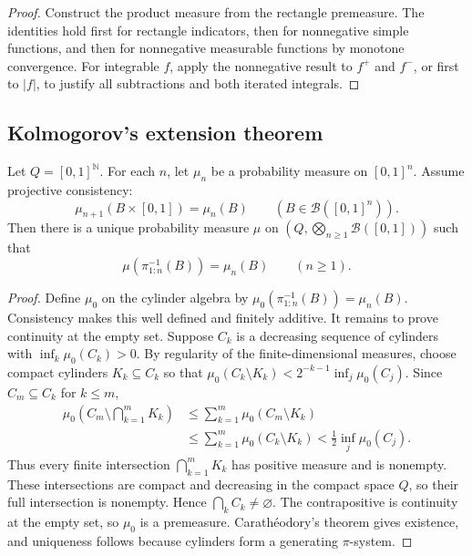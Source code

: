 \begin{proof}
Construct the product measure from the rectangle premeasure. The identities
hold first for rectangle indicators, then for nonnegative simple functions,
and then for nonnegative measurable functions by monotone convergence. For
integrable $f$, apply the nonnegative result to $f^+$ and $f^-$, or first to
$|f|$, to justify all subtractions and both iterated integrals.
\end{proof}

\subsection{Kolmogorov's extension theorem}

\begin{thm}
Let $Q=[0,1]^{\mathbb N}$. For each $n$, let $\mu_n$ be a probability measure
on $[0,1]^n$. Assume projective consistency:
\[
\mu_{n+1}(B\times[0,1])=\mu_n(B)
\qquad(B\in\mathcal B([0,1]^n)).
\]
Then there is a unique probability measure $\mu$ on
$(Q,\bigotimes_{n\ge1}\mathcal B([0,1]))$ such that
\[
\mu(\pi_{1:n}^{-1}(B))=\mu_n(B)
\qquad(n\ge1).
\]
\end{thm}

\begin{proof}
Define $\mu_0$ on the cylinder algebra by
$\mu_0(\pi_{1:n}^{-1}(B))=\mu_n(B)$. Consistency makes this well defined and
finitely additive. It remains to prove continuity at the empty set. Suppose
$C_k$ is a decreasing sequence of cylinders with
$\inf_k\mu_0(C_k)>0$. By regularity of the finite-dimensional measures,
choose compact cylinders $K_k\subseteq C_k$ so that
$\mu_0(C_k\setminus K_k)<2^{-k-1}\inf_j\mu_0(C_j)$. Since
$C_m\subseteq C_k$ for $k\leq m$,
\begin{align*}
\mu_0\!\left(C_m\setminus\bigcap_{k=1}^{m}K_k\right)
&\leq\sum_{k=1}^{m}\mu_0(C_m\setminus K_k)\\
&\leq\sum_{k=1}^{m}\mu_0(C_k\setminus K_k)
 <\frac12\inf_j\mu_0(C_j).
\end{align*}
Thus every finite intersection $\bigcap_{k=1}^{m}K_k$ has positive measure
and is nonempty. These intersections are compact and decreasing in the compact
space $Q$, so their full intersection is nonempty. Hence $\bigcap_kC_k\neq\varnothing$. The
contrapositive is continuity at the empty set, so $\mu_0$ is a premeasure.
Carath\'eodory's theorem gives existence, and uniqueness follows because
cylinders form a generating $\pi$-system.
\end{proof}

